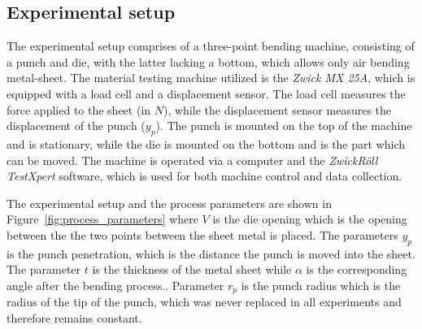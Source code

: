 %
%

\subsection{Experimental setup}\label{subsec:experimental-setup}
The experimental setup comprises of a three-point bending machine, consisting of a punch and
die, with the latter lacking a bottom, which allows only air bending metal-sheet.
The material testing machine utilized is the \textit{Zwick MX 25A}, which is equipped with a load
cell and a displacement sensor.
The load cell measures the force applied to the sheet (in $N$), while the displacement sensor
measures the displacement of the punch ($y_p$).
The punch is mounted on the top of the machine and is stationary, while the die is mounted on the
bottom and is the part which can be moved.
The machine is operated via a computer and the \textit{ZwickRöll TestXpert} software, which is
used for both machine control and data collection.

The experimental setup and the process parameters are shown in
Figure~\ref{fig:process_parameters} where $V$ is the die opening which is the opening between the
the two points between the sheet metal is placed.
The parameters $y_p$ is the punch penetration, which is the distance the punch is moved into the
sheet.
The parameter $t$ is the thickness of the metal sheet while $\alpha$ is the corresponding
angle after the bending process..
Parameter $r_p$ is the punch radius which is the radius of the tip of the punch, which was never
replaced in all experiments and therefore remains constant.



